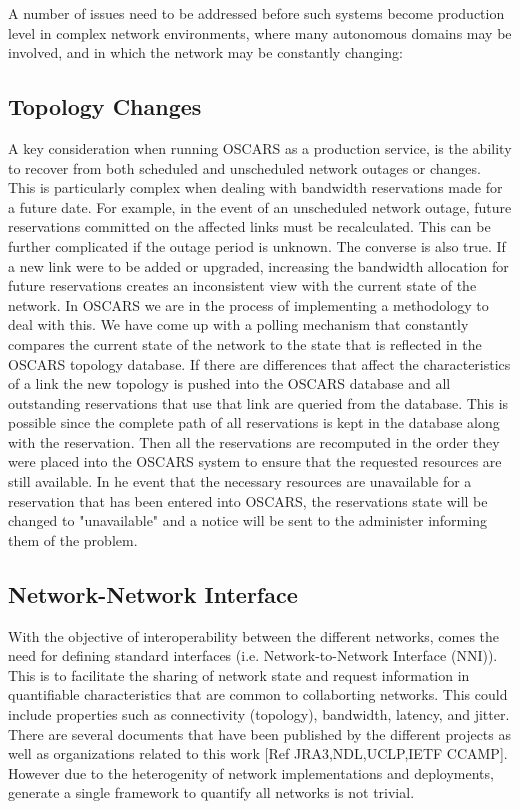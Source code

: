 \documentclass[conference]{IEEEtran}
\begin{document}
A number of issues need to be addressed before such systems become
production level in complex network environments, where many autonomous
domains may be involved, and in which the network may be constantly
changing:

\subsection{Topology Changes}

A key consideration when running OSCARS as a production service, is the ability
to recover from both scheduled and unscheduled network outages or changes.  This
is particularly complex when dealing with bandwidth reservations made for a
future date.  For example, in the event of an unscheduled network outage, future
reservations committed on the affected links must be recalculated. This can be
further complicated if the outage period is unknown.  The converse is also true.
If a new link were to be added or upgraded, increasing the bandwidth allocation
for future reservations creates an inconsistent view with the current state of
the network.  In OSCARS we are in the process of implementing a methodology to
deal with this.  We have come up with a polling mechanism that constantly
compares the current state of the network to the state that is reflected in the
OSCARS topology database. If there are differences that affect the
characteristics of a link the new topology is pushed into the OSCARS database
and all outstanding reservations that use that link are queried from the
database. This is possible since the complete path of all reservations is kept
in the database along with the reservation. Then all the reservations are
recomputed in the order they were placed into the OSCARS system to ensure that
the requested resources are still available.  In he event that the necessary
resources are unavailable for a reservation that has been entered into OSCARS,
the reservations state will be changed to "unavailable" and a notice will be
sent to the administer informing them of the problem.

\subsection{Network-Network Interface}
With the objective of interoperability between the different networks,
comes the need for defining standard interfaces (i.e. Network-to-Network
Interface (NNI)).  This is to facilitate the sharing of network state and
request information in quantifiable characteristics that are common to
collaborting networks.  This could include properties such as connectivity
(topology), bandwidth, latency, and jitter.  There are several documents
that have been published by the different projects as well as organizations
related to this work [Ref JRA3,NDL,UCLP,IETF CCAMP]. However due to the
heterogenity of network implementations and deployments, generate a single
framework to quantify all networks is not trivial.
\end{document}
